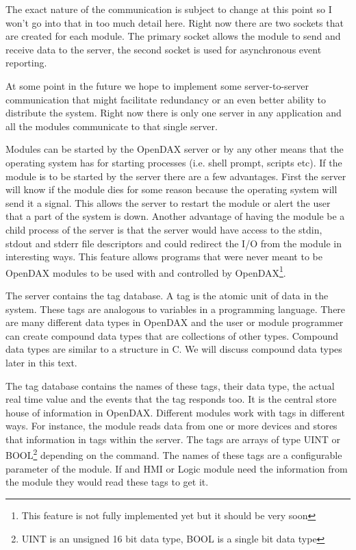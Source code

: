 The exact nature of the communication is subject to change at this point so I won't go into that in too much detail here.  Right now there are two sockets that are created for each module.  The primary socket allows the module to send and receive data to the server, the second socket is used for asynchronous event reporting.

At some point in the future we hope to implement some server-to-server communication that might facilitate redundancy or an even better ability to distribute the system.  Right now there is only one server in any application and all the modules communicate to that single server.

Modules can be started by the OpenDAX server or by any other means that the operating system has for starting processes (i.e. shell prompt, scripts etc).  If the module is to be started by the server there are a few advantages.  First the server will know if the module dies for some reason because the operating system will send it a signal.  This allows the server to restart the module or alert the user that a part of the system is down.  Another advantage of having the module be a child process of the server is that the server would have access to the stdin, stdout and stderr file descriptors and could redirect the I/O from the module in interesting ways.  This feature allows programs that were never meant to be OpenDAX modules to be used with and controlled by OpenDAX\footnote{This feature is not fully implemented yet but it should be very soon}.

The server contains the tag database.  A tag is the atomic unit of data in the system.  These tags are analogous to variables in a programming language.  There are many different data types in OpenDAX and the user or module programmer can create compound data types that are collections of other types.  Compound data types are similar to a structure in C.  We will discuss compound data types later in this text.

The tag database contains the names of these tags, their data type, the actual real time value and the events that the tag responds too.  It is the central store house of information in OpenDAX.  Different modules work with tags in different ways.  For instance, the \modbus {}module reads data from one or more \modbus devices and stores that information in tags within the server.  The tags are arrays of type UINT or BOOL\footnote{UINT is an unsigned 16 bit data type, BOOL is a single bit data type} depending on the command.  The names of these tags are a configurable parameter of the \modbus module.  If and HMI or Logic module need the information from the \modbus module they would read these tags to get it.


